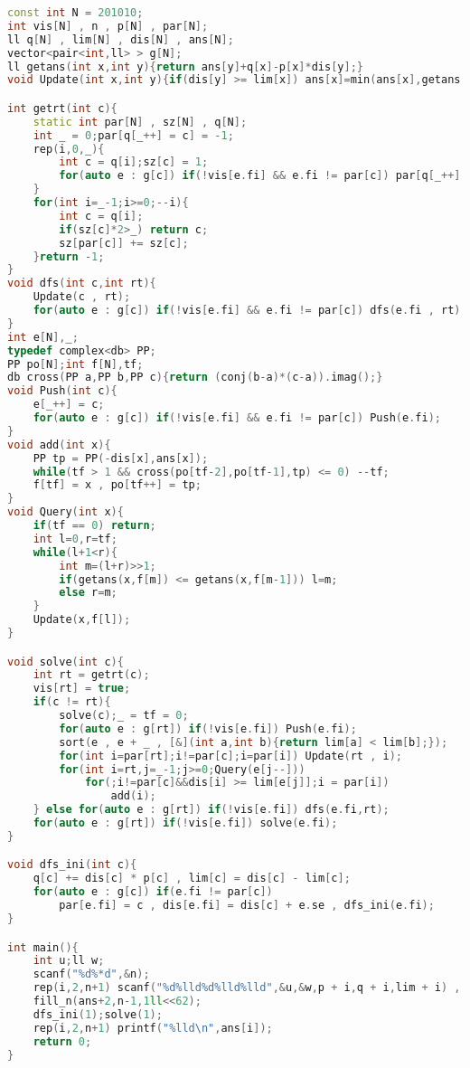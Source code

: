 \begin{lstlisting}[language=C++]
const int N = 201010;
int vis[N] , n , p[N] , par[N];
ll q[N] , lim[N] , dis[N] , ans[N];
vector<pair<int,ll> > g[N];
ll getans(int x,int y){return ans[y]+q[x]-p[x]*dis[y];}
void Update(int x,int y){if(dis[y] >= lim[x]) ans[x]=min(ans[x],getans(x,y));}

int getrt(int c){
    static int par[N] , sz[N] , q[N];
    int _ = 0;par[q[_++] = c] = -1;
    rep(i,0,_){
        int c = q[i];sz[c] = 1;
        for(auto e : g[c]) if(!vis[e.fi] && e.fi != par[c]) par[q[_++] = e.fi] = c;
    }
    for(int i=_-1;i>=0;--i){
        int c = q[i];
        if(sz[c]*2>_) return c;
        sz[par[c]] += sz[c];
    }return -1;
}
void dfs(int c,int rt){
    Update(c , rt);
    for(auto e : g[c]) if(!vis[e.fi] && e.fi != par[c]) dfs(e.fi , rt);
}
int e[N],_;
typedef complex<db> PP;
PP po[N];int f[N],tf;
db cross(PP a,PP b,PP c){return (conj(b-a)*(c-a)).imag();}
void Push(int c){
    e[_++] = c;
    for(auto e : g[c]) if(!vis[e.fi] && e.fi != par[c]) Push(e.fi);
}
void add(int x){
    PP tp = PP(-dis[x],ans[x]);
    while(tf > 1 && cross(po[tf-2],po[tf-1],tp) <= 0) --tf;
    f[tf] = x , po[tf++] = tp;
}
void Query(int x){
    if(tf == 0) return;
    int l=0,r=tf;
    while(l+1<r){
        int m=(l+r)>>1;
        if(getans(x,f[m]) <= getans(x,f[m-1])) l=m;
        else r=m;
    }
    Update(x,f[l]);
}

void solve(int c){
    int rt = getrt(c);
    vis[rt] = true;
    if(c != rt){
        solve(c);_ = tf = 0;
        for(auto e : g[rt]) if(!vis[e.fi]) Push(e.fi);
        sort(e , e + _ , [&](int a,int b){return lim[a] < lim[b];});
        for(int i=par[rt];i!=par[c];i=par[i]) Update(rt , i);
        for(int i=rt,j=_-1;j>=0;Query(e[j--]))
            for(;i!=par[c]&&dis[i] >= lim[e[j]];i = par[i])
                add(i);
    } else for(auto e : g[rt]) if(!vis[e.fi]) dfs(e.fi,rt);
    for(auto e : g[rt]) if(!vis[e.fi]) solve(e.fi);
}

void dfs_ini(int c){
    q[c] += dis[c] * p[c] , lim[c] = dis[c] - lim[c];
    for(auto e : g[c]) if(e.fi != par[c])
        par[e.fi] = c , dis[e.fi] = dis[c] + e.se , dfs_ini(e.fi);
}

int main(){
    int u;ll w;
    scanf("%d%*d",&n);
    rep(i,2,n+1) scanf("%d%lld%d%lld%lld",&u,&w,p + i,q + i,lim + i) , g[i].pb(mp(u,w)) , g[u].pb(mp(i,w));
    fill_n(ans+2,n-1,1ll<<62);
    dfs_ini(1);solve(1);
    rep(i,2,n+1) printf("%lld\n",ans[i]);
    return 0;
}
\end{lstlisting}
